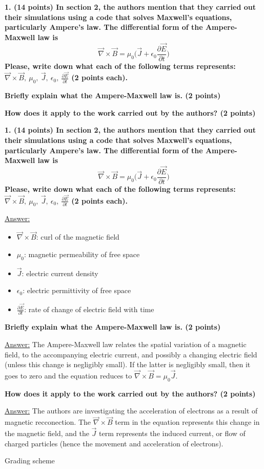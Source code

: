 \documentclass[12pt]{article}
\begin{document}
\textbf{
1. (14 points)
In section 2, the authors mention that they carried out their
simulations using a code that solves Maxwell's equations, particularly
Ampere's law. The differential form of the Ampere-Maxwell law is
    $$ \vec{\nabla}\times\vec{B} = \mu_0\Big( \vec{J} + \epsilon_0\frac
    {\partial \vec{E}}{\partial t}\Big) $$
Please, write down what each of the following terms represents:
 $\vec{\nabla}\times\vec{B},\ \mu_0,\ \vec{J},\
 \epsilon_0,\ \frac{\partial\vec{E}}{\partial t}$
(2 points each).
}

\textbf{Briefly explain what the Ampere-Maxwell law is. (2 points)}

\textbf{How does it apply to the work carried out by the authors?
(2 points)}

\newpage
\textbf{
1. (14 points)
In section 2, the authors mention that they carried out their
simulations using a code that solves Maxwell's equations, particularly
Ampere's law. The differential form of the Ampere-Maxwell law is
    $$ \vec{\nabla}\times\vec{B} = \mu_0\Big( \vec{J} + \epsilon_0\frac
    {\partial \vec{E}}{\partial t}\Big) $$
Please, write down what each of the following terms represents:
 $\vec{\nabla}\times\vec{B},\ \mu_0,\ \vec{J},\
 \epsilon_0,\ \frac{\partial\vec{E}}{\partial t}$
(2 points each).
}

\underline{Answer:}
\begin{itemize}
    \item $\vec{\nabla}\times\vec{B}$: curl of the magnetic field
    \item $\mu_0$: magnetic permeability of free space
    \item $\vec{J}$: electric current density
    \item $\epsilon_0$: electric permittivity of free space
    \item $\frac{\partial\vec{E}}{\partial t}$: rate of change of
    electric field with time
\end{itemize}

\textbf{Briefly explain what the Ampere-Maxwell law is. (2 points)}

\underline{Answer:} The Ampere-Maxwell law
relates the spatial variation of a magnetic field,
to the accompanying electric
current, and possibly a changing electric field
(unless this change is negligibly small).
If the latter is negligibly small,
then it goes to zero and the equation reduces to
$ \vec{\nabla}\times\vec{B} = \mu_0\vec{J} $.

\textbf{How does it apply to the work carried out by the authors?
(2 points)}

\underline{Answer:} The authors are investigating the acceleration of
electrons as a result of magnetic recconection.
The $\vec{\nabla}\times\vec{B}$ term in the equation
represents this change in the magnetic field,
and the $\vec{J}$ term represents the induced current, or
flow of charged particles (hence the movement and
acceleration of electrons).

\newpage
Grading scheme
\end{document}
